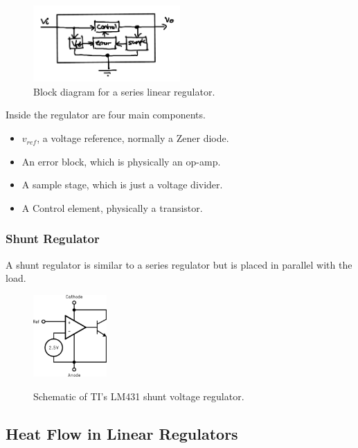 \begin{figure}[H]
\centering
\includegraphics[width=0.5\textwidth]{images/linear-reg.png}
\caption{Block diagram for a series linear regulator.}
\end{figure}

Inside the regulator are four main components. 

\begin{itemize}
    \item $v_{ref}$, a voltage reference, normally a Zener diode.
    \item An error block, which is physically an op-amp.
    \item A sample stage, which is just a voltage divider.
    \item A Control element, physically a transistor.
\end{itemize}

\subsubsection{Shunt Regulator}

A shunt regulator is similar to a series regulator but is placed in parallel with the load. 

\begin{figure}[H]
\centering
\href{http://www.ti.com/product/LM431/datasheet}{\includegraphics[width=0.25\textwidth]{images/shunt-reg.png}}
\caption{Schematic of TI's LM431 shunt voltage regulator.}
\end{figure}

\subsection{Heat Flow in Linear Regulators}

